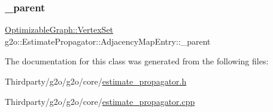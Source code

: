 \subsubsection{\texorpdfstring{\+\_\+parent}{\_parent}}
{\footnotesize\ttfamily \mbox{\hyperlink{classg2o_1_1_hyper_graph_a703938cdb4bb636860eed55a2489d70c}{Optimizable\+Graph\+::\+Vertex\+Set}} g2o\+::\+Estimate\+Propagator\+::\+Adjacency\+Map\+Entry\+::\+\_\+parent\hspace{0.3cm}{\ttfamily [protected]}}



The documentation for this class was generated from the following files\+:\begin{DoxyCompactItemize}
\item 
Thirdparty/g2o/g2o/core/\mbox{\hyperlink{estimate__propagator_8h}{estimate\+\_\+propagator.\+h}}\item 
Thirdparty/g2o/g2o/core/\mbox{\hyperlink{estimate__propagator_8cpp}{estimate\+\_\+propagator.\+cpp}}\end{DoxyCompactItemize}
